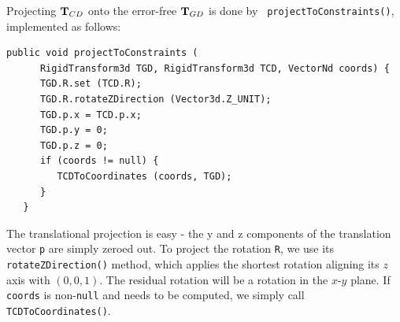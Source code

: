 Projecting ${\bf T}_{CD}$ onto the error-free ${\bf T}_{GD}$ is done by {\tt
projectToConstraints()}, implemented as follows:
%
\begin{lstlisting}[]
   public void projectToConstraints (
      RigidTransform3d TGD, RigidTransform3d TCD, VectorNd coords) {
      TGD.R.set (TCD.R);
      TGD.R.rotateZDirection (Vector3d.Z_UNIT);
      TGD.p.x = TCD.p.x;
      TGD.p.y = 0;
      TGD.p.z = 0;
      if (coords != null) {
         TCDToCoordinates (coords, TGD);
      }
   }
\end{lstlisting}
%
The translational projection is easy - the y and z components of the
translation vector {\tt p} are simply zeroed out. To project the
rotation {\tt R}, we use its {\tt rotateZDirection()} method, which
applies the shortest rotation aligning its $z$ axis with $(0, 0,
1)$. The residual rotation will be a rotation in the $x$-$y$ plane.
If {\tt coords} is non-{\tt null} and needs to be computed, we simply
call {\tt TCDToCoordinates()}.

